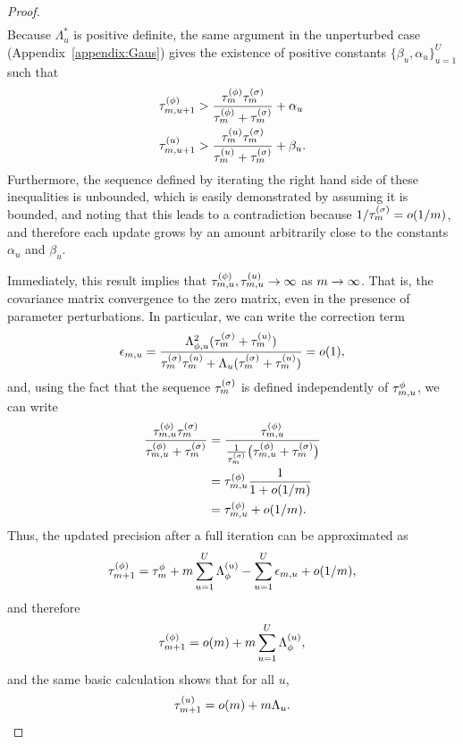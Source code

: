 \documentclass[12pt]{article}\usepackage[]{graphicx}\usepackage[]{xcolor}
\begin{document}
\begin{appendices}
\begin{proof}
\begin{align*}
   \end{align*}
  Because $\Lambda^*_u$ is positive definite, the same argument in the unperturbed case (Appendix~\ref{appendix:Gaus}) gives the existence of positive constants $\{\beta_u, \alpha_u\}_{u = 1}^U$ such that
  \begin{align*}
    \tau^{(\phi)}_{m, u+1} &> \frac{\tau^{(\phi)}_m\tau^{(\sigma)}_m}{\tau^{(\phi)}_m + \tau^{(\sigma)}_m} + \alpha_u \\
    \tau^{(u)}_{m, u+1} &> \frac{\tau^{(u)}_m\tau^{(\sigma)}_m}{\tau^{(u)}_m + \tau^{(\sigma)}_m} + \beta_u.
  \end{align*}
  Furthermore, the sequence defined by iterating the right hand side of these inequalities is unbounded, which is easily demonstrated by assuming it is bounded, and noting that this leads to a contradiction because $1/\tau^{(\sigma)}_m = o(1/m)$, and therefore each update grows by an amount arbitrarily close to the constants $\alpha_u$ and $\beta_u$.

  Immediately, this result implies that $\tau_{m, u}^{(\phi)}, \tau_{m, u}^{(u)} \rightarrow \infty$ as $m \rightarrow \infty$.
  That is, the covariance matrix convergence to the zero matrix, even in the presence of parameter perturbations.
  In particular, we can write the correction term
  $$
  \epsilon_{m, u} = \frac{\Lambda^2_{\phi, u}(\tau^{(\sigma)}_m + \tau^{(u)}_m)}{\tau^{(\sigma)}_m\tau^{(u)}_m + \Lambda_u(\tau^{(\sigma)}_m + \tau^{(u)}_m)} = o(1),
  $$
  and, using the fact that the sequence $\tau^{(\sigma)}_m$ is defined independently of $\tau^{\phi}_{m, u}$, we can write
  \begin{align*}
  \frac{\tau^{(\phi)}_{m, u}\tau^{(\sigma)}_m}{\tau^{(\phi)}_{m, u} + \tau^{(\sigma)}_m} &= \frac{\tau^{(\phi)}_{m, u}}{\frac{1}{\tau^{(\sigma)}_{m}}\big(\tau^{(\phi)}_{m, u} + \tau^{(\sigma)}_{m}\big)} \\
  &= \tau_{m, u}^{(\phi)}\frac{1}{1+o(1/m)} \\
  &= \tau^{(\phi)}_{m, u} + o(1/m).
  \end{align*}
  Thus, the updated precision after a full iteration can be approximated as
  $$
  \tau_{m + 1}^{(\phi)} = \tau^{\phi}_{m} + m\sum_{u = 1}^U \Lambda_{\phi}^{(u)} - \sum_{u = 1}^U\epsilon_{m, u} + o(1/m),
  $$
  and therefore
  $$
  \tau_{m + 1}^{(\phi)} = o(m) + m\sum_{u = 1}^U \Lambda_{\phi}^{(u)},
  $$
  and the same basic calculation shows that for all $u$,
  $$
  \tau^{(u)}_{m+1} = o(m) + m\Lambda_{u}.
  $$


\end{proof}
\end{appendices}
\end{document}
